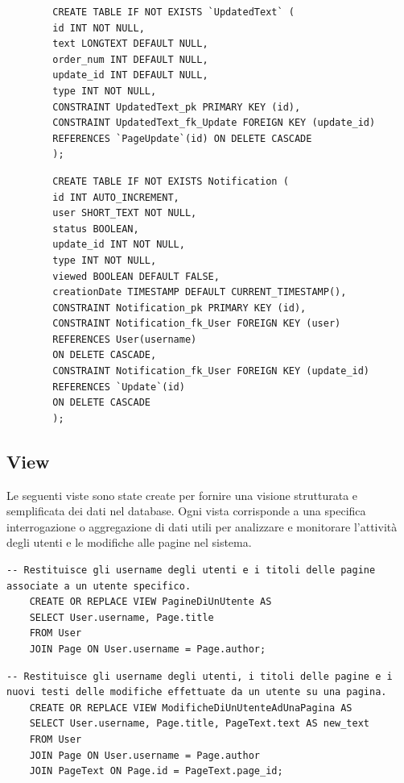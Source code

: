 \documentclass{article}
\begin{document}
	\begin{lstlisting}
		CREATE TABLE IF NOT EXISTS `UpdatedText` (
		id INT NOT NULL,
		text LONGTEXT DEFAULT NULL,
		order_num INT DEFAULT NULL,
		update_id INT DEFAULT NULL,
		type INT NOT NULL,
		CONSTRAINT UpdatedText_pk PRIMARY KEY (id),
		CONSTRAINT UpdatedText_fk_Update FOREIGN KEY (update_id)
		REFERENCES `PageUpdate`(id) ON DELETE CASCADE
		);
	\end{lstlisting}

	\begin{lstlisting}
		CREATE TABLE IF NOT EXISTS Notification (
		id INT AUTO_INCREMENT,
		user SHORT_TEXT NOT NULL,
		status BOOLEAN,
		update_id INT NOT NULL,
		type INT NOT NULL,
		viewed BOOLEAN DEFAULT FALSE,
		creationDate TIMESTAMP DEFAULT CURRENT_TIMESTAMP(),
		CONSTRAINT Notification_pk PRIMARY KEY (id),
		CONSTRAINT Notification_fk_User FOREIGN KEY (user)
		REFERENCES User(username)
		ON DELETE CASCADE,
		CONSTRAINT Notification_fk_User FOREIGN KEY (update_id) 
		REFERENCES `Update`(id)
		ON DELETE CASCADE
		);
	\end{lstlisting}
	
	\newpage
	
	\subsection{View}
	
Le seguenti viste sono state create per fornire una visione strutturata e semplificata dei dati nel database. Ogni vista corrisponde a una specifica interrogazione o aggregazione di dati utili per analizzare e monitorare l'attività degli utenti e le modifiche alle pagine nel sistema.
	
\begin{lstlisting}[caption={Vista PagineDiUnUtente}, label={lst:pagine_di_un_utente}]
	-- Restituisce gli username degli utenti e i titoli delle pagine associate a un utente specifico.
	CREATE OR REPLACE VIEW PagineDiUnUtente AS
	SELECT User.username, Page.title
	FROM User
	JOIN Page ON User.username = Page.author;
\end{lstlisting}

\begin{lstlisting}[caption={Vista ModificheDiUnUtenteAdUnaPagina}, label={lst:modifiche_di_un_utente_ad_una_pagina}]
	-- Restituisce gli username degli utenti, i titoli delle pagine e i nuovi testi delle modifiche effettuate da un utente su una pagina.
	CREATE OR REPLACE VIEW ModificheDiUnUtenteAdUnaPagina AS
	SELECT User.username, Page.title, PageText.text AS new_text
	FROM User
	JOIN Page ON User.username = Page.author
	JOIN PageText ON Page.id = PageText.page_id;
\end{lstlisting}
\end{document}
